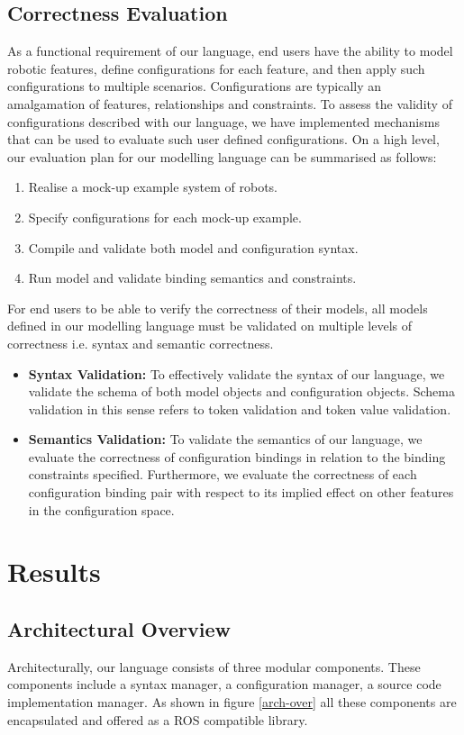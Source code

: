 \documentclass[conference]{IEEEtran}
\begin{document}
\subsection{Correctness Evaluation}
As a functional requirement of our language, end users have the ability to model robotic features, define configurations for each feature, and then apply such configurations to multiple scenarios. Configurations are typically an amalgamation of features, relationships and constraints. To assess the validity of configurations described with our language, we have implemented mechanisms that can be used to evaluate such user defined configurations. On a high level, our evaluation plan for our modelling language can be summarised as follows:
\begin{enumerate}
  \item Realise a mock-up example system of robots.
  \item Specify configurations for each mock-up example.
  \item Compile and validate both model and configuration syntax.
  \item Run model and validate binding semantics and constraints.
\end{enumerate}
For end users to be able to verify the correctness of their models, all models defined in our modelling language must be validated on multiple levels of correctness i.e. syntax and semantic correctness. 
\begin{itemize}[label={}]
  \item \textbf{Syntax Validation: }To effectively validate the syntax of our language, we validate the schema of both model objects and configuration objects. Schema validation in this sense refers to token validation and token value validation.
 
  \item \textbf{Semantics Validation: } To validate the semantics of our language, we evaluate the correctness of configuration bindings in relation to the binding constraints specified. Furthermore, we evaluate the correctness of each configuration binding pair with respect to its implied effect on other features in the configuration space.
  
\end{itemize}


\section{Results}
\subsection{Architectural Overview}
Architecturally, our language consists of three modular components. These components include a syntax manager, a configuration manager, a source code implementation manager. As shown in figure \ref{arch-over} all these components are encapsulated and offered as a ROS compatible library.
\end{document}
